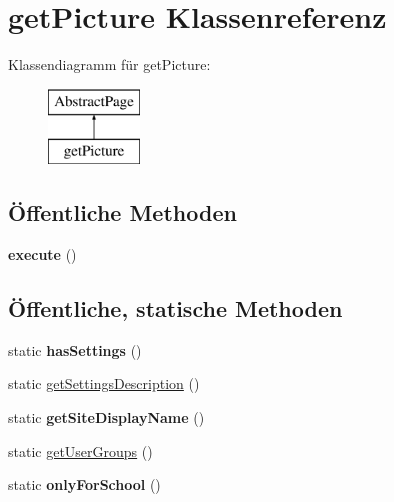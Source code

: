 \hypertarget{classget_picture}{}\section{get\+Picture Klassenreferenz}
\label{classget_picture}
Klassendiagramm für get\+Picture\+:\begin{figure}[H]
\begin{center}
\leavevmode
\includegraphics[height=2.000000cm]{classget_picture}
\end{center}
\end{figure}
\subsection*{Öffentliche Methoden}
\begin{DoxyCompactItemize}
\item 
\mbox{\label{classget_picture_a0e8e664e37ab00f046678c99a26b52db}} 
{\bfseries execute} ()
\end{DoxyCompactItemize}
\subsection*{Öffentliche, statische Methoden}
\begin{DoxyCompactItemize}
\item 
\mbox{\label{classget_picture_a48af759ff789725237d14fa6a311b9f7}} 
static {\bfseries has\+Settings} ()
\item 
static \mbox{\hyperlink{classget_picture_a5ee51470a762b6e8e3e77a03a372294a}{get\+Settings\+Description}} ()
\item 
\mbox{\label{classget_picture_a157cd17a85f0453ce50db340727d3e96}} 
static {\bfseries get\+Site\+Display\+Name} ()
\item 
static \mbox{\hyperlink{classget_picture_a2fe10da0634bf54d950004ab61c8907c}{get\+User\+Groups}} ()
\item 
\mbox{\label{classget_picture_a9dea189db61f3f8339fe93fe3f5171a6}} 
static {\bfseries only\+For\+School} ()
\end{DoxyCompactItemize}
